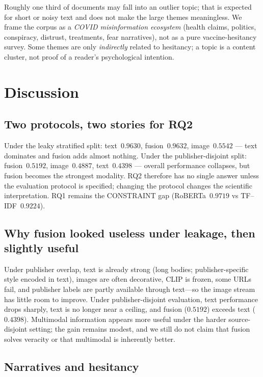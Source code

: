 \documentclass[12pt, a4paper]{report}
\begin{document}
Roughly one third of documents may fall into an outlier topic; that is expected for short or noisy text and does not make the large themes meaningless.
We frame the corpus as a \emph{COVID misinformation ecosystem} (health claims, politics, conspiracy, distrust, treatments, fear narratives), not as a pure vaccine-hesitancy survey.
Some themes are only \emph{indirectly} related to hesitancy; a topic is a content cluster, not proof of a reader's psychological intention.

\section{Discussion}
\label{sec:discussion}

\subsection{Two protocols, two stories for RQ2}

Under the leaky stratified split: text~$0.9630$, fusion~$0.9632$, image~$0.5542$ --- text dominates and fusion adds almost nothing.
Under the publisher-disjoint split: fusion~$0.5192$, image~$0.4887$, text~$0.4398$ --- overall performance collapses, but fusion becomes the strongest modality.
RQ2 therefore has no single answer unless the evaluation protocol is specified; changing the protocol changes the scientific interpretation.
RQ1 remains the CONSTRAINT gap (RoBERTa~$0.9719$ vs TF--IDF~$0.9224$).

\subsection{Why fusion looked useless under leakage, then slightly useful}

Under publisher overlap, text is already strong (long bodies; publisher-specific style encoded in text), images are often decorative, CLIP is frozen, some URLs fail, and publisher labels are partly available through text---so the image stream has little room to improve.
Under publisher-disjoint evaluation, text performance drops sharply, text is no longer near a ceiling, and fusion ($0.5192$) exceeds text ($0.4398$).
Multimodal information appears more useful under the harder source-disjoint setting; the gain remains modest, and we still do not claim that fusion solves veracity or that multimodal is inherently better.

\subsection{Narratives and hesitancy}
\end{document}
